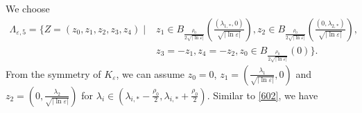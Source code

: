 \documentclass[12pt,reqno]{amsart}
\numberwithin{equation}{section}
\theoremstyle{definition}
\theoremstyle{remark}
\begin{document}
We choose 
\begin{equation*} 
\begin{split}
\Lambda_{\varepsilon, 5}=\bigg\{Z=(z_0,  z_1,  z_2, z_3, z_4) \mid &z_1\in B_{\frac{\rho_0}{2\sqrt{|\ln\varepsilon|}}}\left (\frac{(\lambda_{1,*},0)}{\sqrt{|\ln\varepsilon|}}\right ), z_2\in B_{\frac{\rho_0}{2\sqrt{|\ln\varepsilon|}}}\left (\frac{(0,\lambda_{2,*})}{\sqrt{|\ln\varepsilon|}}\right ),\\
&z_3=-z_1,z_4=-z_2, z_0\in B_{\frac{\rho_0}{2\sqrt{|\ln\varepsilon|}}}\left (0\right )\bigg\}.
\end{split}
\end{equation*}
From the symmetry of $ K_\varepsilon $, we can assume $ z_0=0 $, $ z_1=\left( \frac{\lambda_1}{\sqrt{|\ln\varepsilon|}},0\right)  $ and $ z_2=\left( 0,\frac{\lambda_2}{\sqrt{|\ln\varepsilon|}}\right)  $ for $\lambda_i\in \left( \lambda_{i,*}-\frac{\rho_0}{2}, \lambda_{i,*}+\frac{\rho_0}{2}\right)   $. %
Similar to \eqref{602}, we have
\end{document}
